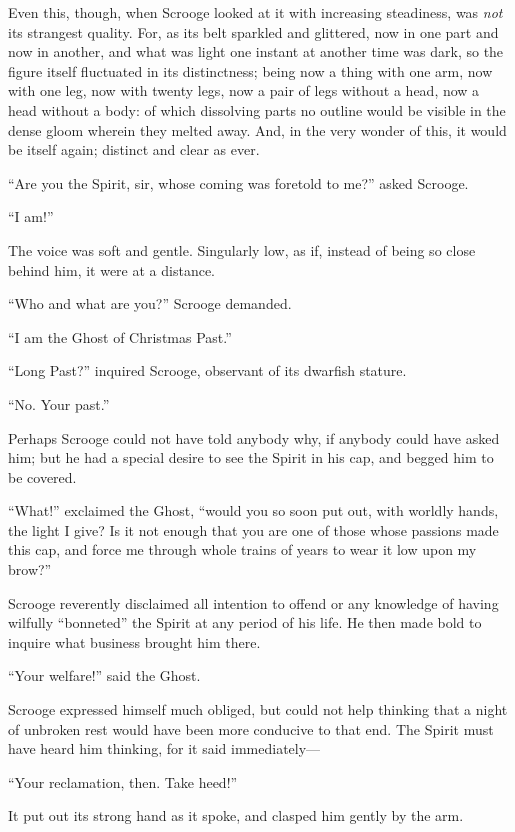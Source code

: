 \documentclass[paper=5.5in:8.5in,BCOR=15mm,twoside,DIV=15,headinclude=off,12pt,chapterprefix=off,openany,headings=huge]{scrbook} %
\begin{document}
Even this, though, when Scrooge looked at it with increasing steadiness, was \textit{not} its strangest quality. For, as its belt sparkled and glittered, now in one part and now in another, and what was light one instant at another time was dark, so the figure itself fluctuated in its distinctness; being now a thing with one arm, now with one leg, now with twenty legs, now a pair of legs without a head, now a head without a body: of which dissolving parts no outline would be visible in the dense gloom wherein they melted away. And, in the very wonder of this, it would be itself again; distinct and clear as ever.

\enquote{Are you the Spirit, sir, whose coming was foretold to me?} asked Scrooge.

\enquote{I am!}

The voice was soft and gentle. Singularly low, as if, instead of being so close behind him, it were at a distance.

\enquote{Who and what are you?} Scrooge demanded.

\enquote{I am the Ghost of Christmas Past.}

\enquote{Long Past?} inquired Scrooge, observant of its dwarfish stature.

\enquote{No. Your past.}

Perhaps Scrooge could not have told anybody why, if anybody could have asked him; but he had a special desire to see the Spirit in his cap, and begged him to be covered.

\enquote{What!} exclaimed the Ghost, \enquote{would you so soon put out, with worldly hands, the light I give? Is it not enough that you are one of those whose passions made this cap, and force me through whole trains of years to wear it low upon my brow?}

Scrooge reverently disclaimed all intention to offend or any knowledge of having wilfully \enquote{bonneted} the Spirit at any period of his life. He then made bold to inquire what business brought him there.

\enquote{Your welfare!} said the Ghost.

Scrooge expressed himself much obliged, but could not help thinking that a night of unbroken rest would have been more conducive to that end. The Spirit must have heard him thinking, for it said immediately—

\enquote{Your reclamation, then. Take heed!}

It put out its strong hand as it spoke, and clasped him gently by the arm.
\end{document}
